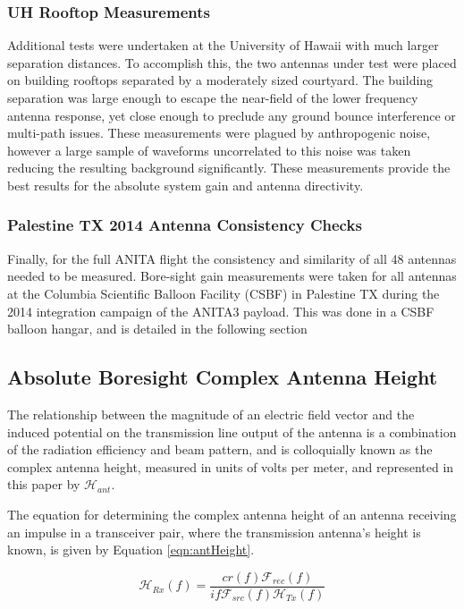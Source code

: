 		\subsubsection{UH Rooftop Measurements}
	Additional tests were undertaken at the University of Hawaii with much larger separation distances.  To accomplish this, the two antennas under test were placed on building rooftops separated by a moderately sized courtyard.  The building separation was large enough to escape the near-field of the lower frequency antenna response, yet close enough to preclude any ground bounce interference or multi-path issues.  These measurements were plagued by anthropogenic noise, however a large sample of waveforms uncorrelated to this noise was taken reducing the resulting background significantly.  These measurements provide the best results for the absolute system gain and antenna directivity.
	
		\subsubsection{Palestine TX 2014 Antenna Consistency Checks}
	Finally, for the full ANITA flight the consistency and similarity of all 48 antennas needed to be measured.  Bore-sight gain measurements were taken for all antennas at the Columbia Scientific Balloon Facility (CSBF) in Palestine TX during the 2014 integration campaign of the ANITA3 payload.  This was done in a CSBF balloon hangar, and is detailed in the following section
	
	
	
	\subsection{Absolute Boresight Complex Antenna Height}
		
		The relationship between the magnitude of an electric field vector and the induced potential on the transmission line output of the antenna is a combination of the radiation efficiency and beam pattern, and is colloquially known as the complex antenna height, measured in units of volts per meter, and represented in this paper by $\mathcal{H}_{ant}$.
		
		
	The equation for determining the complex antenna height of an antenna receiving an impulse in a transceiver pair, where the transmission antenna's height is known, is given by Equation \ref{eqn:antHeight}.
	
\begin{equation}
\mathcal{H}_{Rx}(f) = \frac{ c r(f) \mathcal{F}_{rec}(f)}{ if \mathcal{F}_{src}(f) \mathcal{H}_{Tx}(f) } 
\label{eqn:antHeight}
\end{equation}

